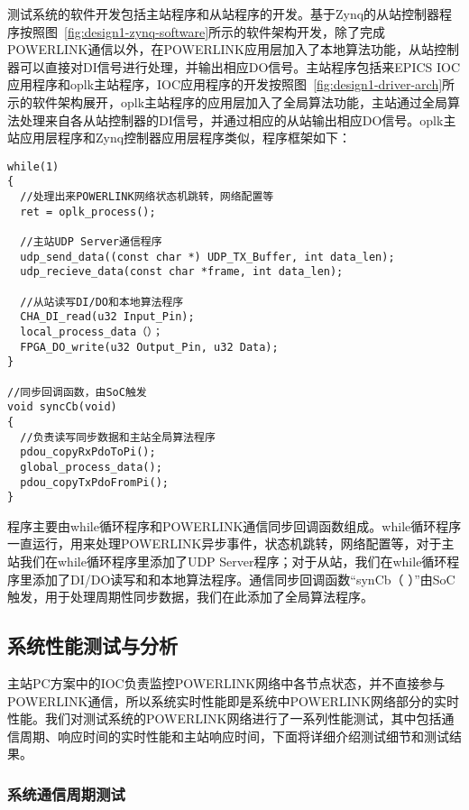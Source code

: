 \label{subsubsection:测试系统软件开发}

测试系统的软件开发包括主站程序和从站程序的开发。基于Zynq的从站控制器程序按照图~\ref{fig:design1-zynq-software}所示的软件架构开发，除了完成POWERLINK通信以外，在POWERLINK应用层加入了本地算法功能，从站控制器可以直接对DI信号进行处理，并输出相应DO信号。主站程序包括来EPICS IOC应用程序和oplk主站程序，IOC应用程序的开发按照图~\ref{fig:design1-driver-arch}所示的软件架构展开，oplk主站程序的应用层加入了全局算法功能，主站通过全局算法处理来自各从站控制器的DI信号，并通过相应的从站输出相应DO信号。oplk主站应用层程序和Zynq控制器应用层程序类似，程序框架如下：
\begin{lstlisting}
while(1)
{ 
  //处理出来POWERLINK网络状态机跳转，网络配置等
  ret = oplk_process();

  //主站UDP Server通信程序
  udp_send_data((const char *) UDP_TX_Buffer, int data_len);
  udp_recieve_data(const char *frame, int data_len);

  //从站读写DI/DO和本地算法程序
  CHA_DI_read(u32 Input_Pin);
  local_process_data（）；
  FPGA_DO_write(u32 Output_Pin, u32 Data);
}

//同步回调函数，由SoC触发
void syncCb(void)
{
  //负责读写同步数据和主站全局算法程序
  pdou_copyRxPdoToPi();
  global_process_data();
  pdou_copyTxPdoFromPi();
}
\end{lstlisting}

程序主要由while循环程序和POWERLINK通信同步回调函数组成。while循环程序一直运行，用来处理POWERLINK异步事件，状态机跳转，网络配置等，对于主站我们在while循环程序里添加了UDP Server程序；对于从站，我们在while循环程序里添加了DI/DO读写和和本地算法程序。通信同步回调函数“synCb（ ）”由SoC触发，用于处理周期性同步数据，我们在此添加了全局算法程序。


\subsection{系统性能测试与分析}

主站PC方案中的IOC负责监控POWERLINK网络中各节点状态，并不直接参与POWERLINK通信，所以系统实时性能即是系统中POWERLINK网络部分的实时性能。我们对测试系统的POWERLINK网络进行了一系列性能测试，其中包括通信周期、响应时间的实时性能和主站响应时间，下面将详细介绍测试细节和测试结果。

\subsubsection{系统通信周期测试}

\label{subsection:主站PC方案系统通信周期测试}

